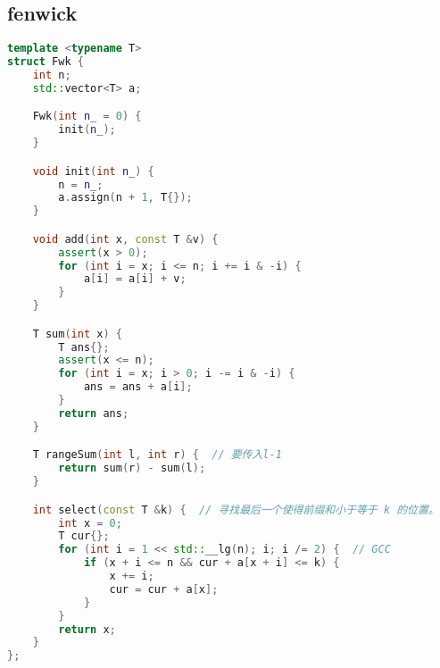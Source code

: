 \subsection{fenwick}
\begin{lstlisting}[language=C++]
template <typename T>
struct Fwk {
    int n;
    std::vector<T> a;

    Fwk(int n_ = 0) {
        init(n_);
    }

    void init(int n_) {
        n = n_;
        a.assign(n + 1, T{});
    }

    void add(int x, const T &v) {
        assert(x > 0);
        for (int i = x; i <= n; i += i & -i) {
            a[i] = a[i] + v;
        }
    }

    T sum(int x) {
        T ans{};
        assert(x <= n);
        for (int i = x; i > 0; i -= i & -i) {
            ans = ans + a[i];
        }
        return ans;
    }

    T rangeSum(int l, int r) {  // 要传入l-1
        return sum(r) - sum(l);
    }

    int select(const T &k) {  // 寻找最后一个使得前缀和小于等于 k 的位置。
        int x = 0;
        T cur{};
        for (int i = 1 << std::__lg(n); i; i /= 2) {  // GCC
            if (x + i <= n && cur + a[x + i] <= k) {
                x += i;
                cur = cur + a[x];
            }
        }
        return x;
    }
};
\end{lstlisting}
